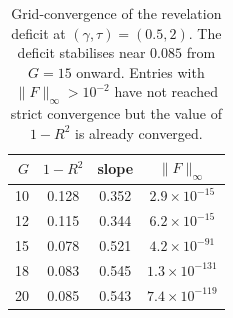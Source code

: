 \documentclass[12pt,letterpaper]{article}
\theoremstyle{definition}
\theoremstyle{remark}
\newcommand{\1}{\mathbf{1}}
\begin{document}
\begin{table}[htbp]
\centering
\caption{Grid-convergence of the revelation deficit at $(\gamma,\tau)=(0.5,2)$.
The deficit stabilises near $0.085$ from $G=15$ onward. Entries with
$\|F\|_\infty>10^{-2}$ have not reached strict convergence but the
value of $1-R^{2}$ is already converged.}
\label{tab:G-ladder}
\begin{tabular}{rccc}
\toprule
$G$ & $1-R^{2}$ & slope & $\|F\|_\infty$ \\
\midrule
\rowcolor{black!15} 10 & 0.128 & 0.352 & $2.9\times 10^{-15}$ \\
\rowcolor{black!15} 12 & 0.115 & 0.344 & $6.2\times 10^{-15}$ \\
15 & 0.078 & 0.521 & $4.2\times 10^{-91}$ \\
18 & 0.083 & 0.545 & $1.3\times 10^{-131}$ \\
20 & 0.085 & 0.543 & $7.4\times 10^{-119}$ \\
\bottomrule
\end{tabular}
\end{table}
\end{document}
